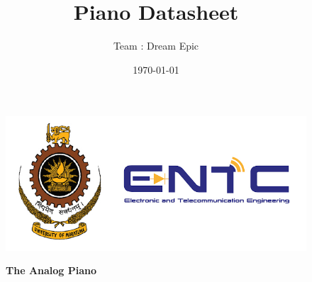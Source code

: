 \documentclass[a4paper,12pt,oneside,pdflatex,italian,final,twocolumn]{article}
\title{Piano Datasheet}
\author{Team : Dream Epic }
\date{\today}
\begin{document}
\pagestyle{fancy}

\chead {\today}

\onecolumn

\begin{figure}
    \begin{minipage}{0.47\textwidth}
        \centering
        \includegraphics[width=.7\textwidth,left,]{entc_uom_logo.jpg}
    \end{minipage}
    \hfill
    \begin{minipage}{0.47\textwidth}
        \raggedleft
        \Huge \textbf{The Analog Piano}
    \end{minipage}
\end{figure}
\end{document}
